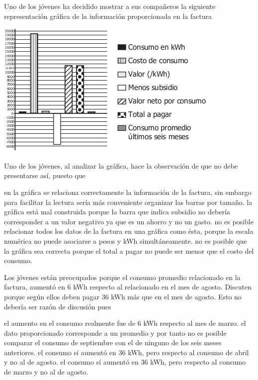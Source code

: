 \documentclass[10pt,addpoints]{exam}
\begin{document}
\begin{questions}
Uno de los jóvenes ha decidido mostrar a sus compañeros la siguiente representación gráfica de la información proporcionada en la factura
\begin{center}
\includegraphics[scale=.7]{Images/consumo.png} 
\end{center}
\question \label{q01}
Uno de los jóvenes, al analizar la gráfica, hace la observación de que no debe presentarse así, puesto que
\begin{choices}
\choice en la gráfica se relaciona correctamente la información de la factura, sin embargo para facilitar la lectura sería más conveniente organizar las barras por tamaño.
\choice la gráfica está mal construida porque la barra que indica subsidio no debería corresponder a un valor negativo ya que es un ahorro y no un gasto.
\CorrectChoice no es posible relacionar todos los datos de la factura en una gráfica como ésta, porque la escala numérica no puede asociarse a pesos y kWh simultáneamente.
\choice no es posible que la gráfica sea correcta porque el total a pagar no puede ser menor que el costo del consumo.
\end{choices}
\question  \label{q02} Los jóvenes están preocupados porque el consumo promedio relacionado en la factura, aumentó en 6 kWh respecto al relacionado en el mes de agosto. Discuten porque según ellos deben pagar 36 kWh más que en el mes de agosto. Esto no debería ser razón de discusión pues
\begin{choices}
\choice el aumento en el consumo realmente fue de 6 kWh respecto al mes de marzo.
\choice el dato proporcionado corresponde a un promedio y por tanto no es posible comparar el consumo de septiembre con el de ninguno de los seis meses anteriores.
\choice el consumo sí aumentó en 36 kWh, pero respecto al consumo de abril y no al de agosto.
\CorrectChoice el consumo sí aumentó en 36 kWh, pero respecto al consumo de marzo y no al de agosto.
\end{choices}

\end{questions}
\end{document}
